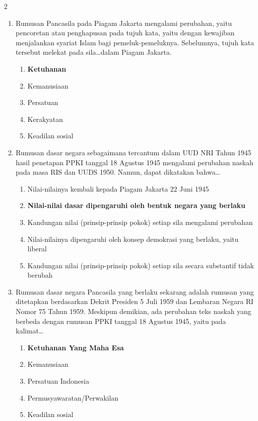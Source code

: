 \documentclass[10pt,a4paper]{article}
\begin{document}
\begin{multicols}{2}
\begin{enumerate}
  \item Rumusan Pancasila pada Piagam Jakarta mengalami perubahan, yaitu pencoretan atau penghapusan pada tujuh kata, yaitu dengan kewajiban menjalankan syariat Islam bagi pemeluk-pemeluknya. Sebelumnya, tujuh kata tersebut melekat pada sila\dots dalam Piagam Jakarta.
    \begin{enumerate}
    \item \textbf{Ketuhanan}
    \item Kemanusiaan
    \item Persatuan
    \item Kerakyatan
    \item Keadilan sosial
    \end{enumerate}

  \item Rumusan dasar negara sebagaimana tercantum dalam UUD NRI Tahun 1945 hasil penetapan PPKI tanggal 18 Agustus 1945 mengalami perubahan naskah pada masa RIS dan UUDS 1950. Namun, dapat dikatakan bahwa\dots
    \begin{enumerate}
    \item Nilai-nilainya kembali kepada Piagam Jakarta 22 Juni 1945
    \item \textbf{Nilai-nilai dasar dipengaruhi oleh bentuk negara yang berlaku}
    \item Kandungan nilai (prinsip-prinsip pokok) setiap sila mengalami perubahan
    \item Nilai-nilainya dipengaruhi oleh konsep demokrasi yang berlaku, yaitu liberal
    \item Kandungan nilai (prinsip-prinsip pokok) setiap sila secara substantif tidak berubah
    \end{enumerate}

  \item Rumusan dasar negara Pancasila yang berlaku sekarang adalah rumusan yang ditetapkan berdasarkan Dekrit Presiden 5 Juli 1959 dan Lembaran Negara RI Nomor 75 Tahun 1959. Meskipun demikian, ada perubahan teks naskah yang berbeda dengan rumusan PPKI tanggal 18 Agustus 1945, yaitu pada kalimat\dots
    \begin{enumerate}
    \item \textbf{Ketuhanan Yang Maha Esa}
    \item Kemanusiaan
    \item Persatuan Indonesia
    \item Permusyawaratan/Perwakilan
    \item Keadilan sosial
    \end{enumerate}


\end{enumerate}
\end{multicols}
\end{document}
